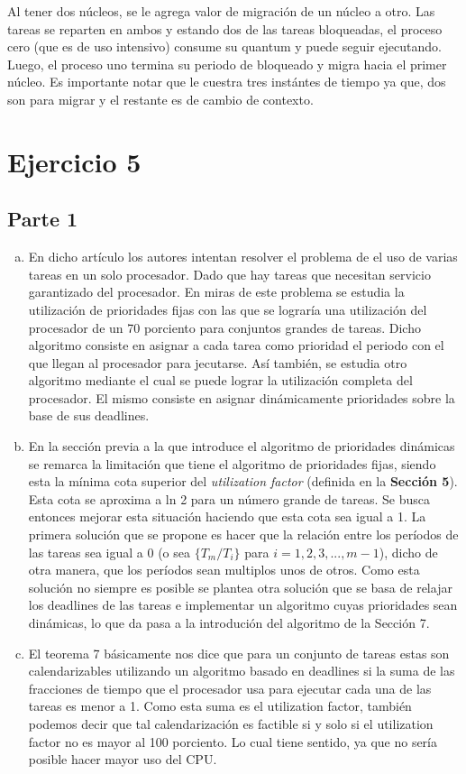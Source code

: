 \documentclass[a4paper,11pt]{article}
\begin{document}
Al tener dos n\'ucleos, se le agrega valor de migraci\'on de un n\'ucleo a otro. Las tareas se reparten en ambos y estando dos de las tareas bloqueadas, el proceso cero (que es de uso intensivo) consume su quantum y puede seguir ejecutando. Luego, el proceso uno termina su periodo de bloqueado y migra hacia el primer n\'ucleo. Es importante notar que le cuestra tres inst\'antes de tiempo ya que, dos son para migrar y el restante es de cambio de contexto. 


\section{Ejercicio 5}
\subsection{Parte 1}
	
	\begin{enumerate}[a)]
	\item En dicho art\'iculo los autores intentan resolver el problema de el uso de varias tareas en un solo procesador. Dado que hay tareas que necesitan servicio garantizado del procesador. 
		En miras de este problema se estudia la utilizaci\'on de prioridades fijas con las que se lograr\'ia una utilizaci\'on del procesador de un 70 porciento para conjuntos grandes de tareas. Dicho algoritmo consiste en asignar a cada tarea como prioridad el periodo con el que llegan al procesador para jecutarse.
		As\'i tambi\'en, se estudia otro algoritmo mediante el cual se puede lograr la utilizaci\'on completa del procesador. El mismo consiste en asignar dinámicamente prioridades sobre la base de sus deadlines.

	\item En la sección previa a la que introduce el algoritmo de prioridades dinámicas se remarca la limitación que tiene el algoritmo de prioridades fijas, siendo esta la mínima cota superior del \emph{utilization factor} (definida en la \textbf{Sección 5}). Esta cota se aproxima a ln 2 para un número grande de tareas. Se busca entonces mejorar esta situación haciendo que esta cota sea igual a 1. La primera solución que se propone es hacer que la relación entre los períodos de las tareas sea igual a 0 (o sea $\{T_{m}/T_{i}\}$ para $i=1,2,3,...,m-1$), dicho de otra manera, que los períodos sean multiplos unos de otros. Como esta solución no siempre es posible se plantea otra solución que se basa de relajar los deadlines de las tareas e implementar un algoritmo cuyas prioridades sean dinámicas, lo que da pasa a la introdución del algoritmo de la Sección 7.

	\item El teorema 7 básicamente nos dice que para un conjunto de tareas estas son calendarizables utilizando un algoritmo basado en deadlines si la suma de las fracciones de tiempo que el procesador usa para ejecutar cada una de las tareas es menor a 1. Como esta suma es el utilization factor, también podemos decir que tal calendarización es factible si y solo si el utilization factor no es mayor al 100 porciento. Lo cual tiene sentido, ya que no sería posible hacer mayor uso del CPU.

	\end{enumerate}
\end{document}
